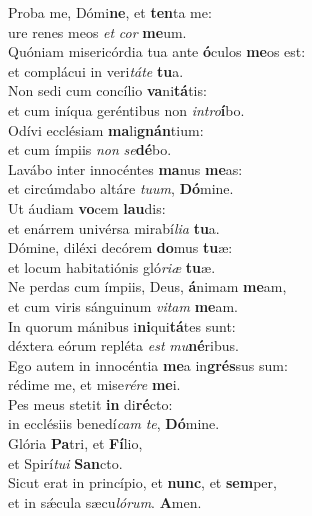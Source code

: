 \evenverse Proba me, Dómi\textbf{ne}, et \textbf{ten}ta me:~\*\\
\evenverse ure renes meos \textit{et} \textit{cor} \textbf{me}um.\\
\oddverse Quóniam misericórdia tua ante \textbf{ó}culos \textbf{me}os est:~\*\\
\oddverse et complácui in veri\textit{tá}\textit{te} \textbf{tu}a.\\
\evenverse Non sedi cum concílio \textbf{va}ni\textbf{tá}tis:~\*\\
\evenverse et cum iníqua geréntibus non \textit{in}\textit{tro}\textbf{í}bo.\\
\oddverse Odívi ecclésiam \textbf{ma}li\textbf{gnán}tium:~\*\\
\oddverse et cum ímpiis \textit{non} \textit{se}\textbf{dé}bo.\\
\evenverse Lavábo inter innocéntes \textbf{ma}nus \textbf{me}as:~\*\\
\evenverse et circúmdabo altáre \textit{tu}\textit{um}, \textbf{Dó}mine.\\
\oddverse Ut áudiam \textbf{vo}cem \textbf{lau}dis:~\*\\
\oddverse et enárrem univérsa mirabí\textit{li}\textit{a} \textbf{tu}a.\\
\evenverse Dómine, diléxi decórem \textbf{do}mus \textbf{tu}æ:~\*\\
\evenverse et locum habitatiónis gló\textit{ri}\textit{æ} \textbf{tu}æ.\\
\oddverse Ne perdas cum ímpiis, Deus, \textbf{á}nimam \textbf{me}am,~\*\\
\oddverse et cum viris sánguinum \textit{vi}\textit{tam} \textbf{me}am.\\
\evenverse In quorum mánibus i\textbf{ni}qui\textbf{tá}tes sunt:~\*\\
\evenverse déxtera eórum repléta \textit{est} \textit{mu}\textbf{né}ribus.\\
\oddverse Ego autem in innocéntia \textbf{me}a in\textbf{grés}sus sum:~\*\\
\oddverse rédime me, et mise\textit{ré}\textit{re} \textbf{me}i.\\
\evenverse Pes meus stetit \textbf{in} di\textbf{ré}cto:~\*\\
\evenverse in ecclésiis benedí\textit{cam} \textit{te}, \textbf{Dó}mine.\\
\oddverse Glória \textbf{Pa}tri, et \textbf{Fí}lio,~\*\\
\oddverse et Spirí\textit{tu}\textit{i} \textbf{San}cto.\\
\evenverse Sicut erat in princípio, et \textbf{nunc}, et \textbf{sem}per,~\*\\
\evenverse et in sǽcula sæcu\textit{ló}\textit{rum}. \textbf{A}men.\\
